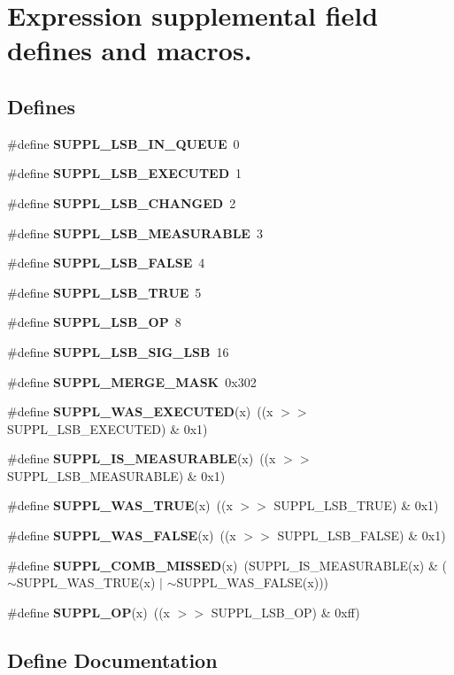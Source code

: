 \section{Expression supplemental field defines and macros.}
\label{group__expr__suppl}
\subsection*{Defines}
\begin{CompactItemize}
\item 
\#define {\bf SUPPL\_\-LSB\_\-IN\_\-QUEUE}\ 0
\item 
\#define {\bf SUPPL\_\-LSB\_\-EXECUTED}\ 1
\item 
\#define {\bf SUPPL\_\-LSB\_\-CHANGED}\ 2
\item 
\#define {\bf SUPPL\_\-LSB\_\-MEASURABLE}\ 3
\item 
\#define {\bf SUPPL\_\-LSB\_\-FALSE}\ 4
\item 
\#define {\bf SUPPL\_\-LSB\_\-TRUE}\ 5
\item 
\#define {\bf SUPPL\_\-LSB\_\-OP}\ 8
\item 
\#define {\bf SUPPL\_\-LSB\_\-SIG\_\-LSB}\ 16
\item 
\#define {\bf SUPPL\_\-MERGE\_\-MASK}\ 0x302
\item 
\#define {\bf SUPPL\_\-WAS\_\-EXECUTED}(x)\ ((x $>$$>$ SUPPL\_\-LSB\_\-EXECUTED) \& 0x1)
\item 
\#define {\bf SUPPL\_\-IS\_\-MEASURABLE}(x)\ ((x $>$$>$ SUPPL\_\-LSB\_\-MEASURABLE) \& 0x1)
\item 
\#define {\bf SUPPL\_\-WAS\_\-TRUE}(x)\ ((x $>$$>$ SUPPL\_\-LSB\_\-TRUE) \& 0x1)
\item 
\#define {\bf SUPPL\_\-WAS\_\-FALSE}(x)\ ((x $>$$>$ SUPPL\_\-LSB\_\-FALSE) \& 0x1)
\item 
\#define {\bf SUPPL\_\-COMB\_\-MISSED}(x)\ (SUPPL\_\-IS\_\-MEASURABLE(x) \& ($\sim$SUPPL\_\-WAS\_\-TRUE(x) $|$ $\sim$SUPPL\_\-WAS\_\-FALSE(x)))
\item 
\#define {\bf SUPPL\_\-OP}(x)\ ((x $>$$>$ SUPPL\_\-LSB\_\-OP) \& 0xff)
\end{CompactItemize}


\subsection{Define Documentation}
